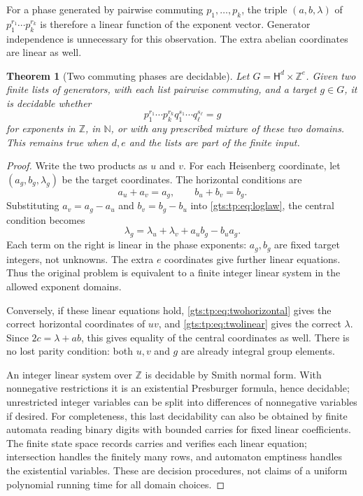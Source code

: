 \documentclass[11pt,letterpaper]{article}
\newtheorem{theorem}{Theorem}[section]
\theoremstyle{definition}
\theoremstyle{remark}
\newcommand{\ZZ}{\mathbb Z}
\newcommand{\NN}{\mathbb N}
\newcommand{\HH}{\mathsf H}
\begin{document}
For a phase generated by pairwise commuting $p_1,\ldots,p_k$, the triple
$(a,b,\lambda)$ of $p_1^{r_1}\cdots p_k^{r_k}$ is therefore a linear function
of the exponent vector. Generator independence is unnecessary for this
observation. The extra abelian coordinates are linear as well.

\begin{theorem}[Two commuting phases are decidable]\label{gts:tp:thm:two}
Let $G=\HH^d\times\ZZ^e$. Given two finite lists of generators, with each list
pairwise commuting, and a target $g\in G$, it is decidable whether
\[
               p_1^{r_1}\cdots p_k^{r_k}
               q_1^{s_1}\cdots q_\ell^{s_\ell}=g
\]
for exponents in $\ZZ$, in $\NN$, or with any prescribed mixture of these
two domains. This remains true when $d,e$ and the lists are part of the
finite input.
\end{theorem}
\begin{proof}
Write the two products as $u$ and $v$. For each Heisenberg coordinate, let
$(a_g,b_g,\lambda_g)$ be the target coordinates. The horizontal conditions
are
\begin{equation}\label{gts:tp:eq:twohorizontal}
                     a_u+a_v=a_g,\qquad b_u+b_v=b_g.
\end{equation}
Substituting $a_v=a_g-a_u$ and $b_v=b_g-b_u$ into
\eqref{gts:tp:eq:loglaw}, the central condition becomes
\begin{equation}\label{gts:tp:eq:twolinear}
             \lambda_g=\lambda_u+\lambda_v+a_u b_g-b_u a_g.
\end{equation}
Each term on the right is linear in the phase exponents: $a_g,b_g$ are
fixed target integers, not unknowns. The extra $e$ coordinates give further
linear equations. Thus the original problem is equivalent to a finite
integer linear system in the allowed exponent domains.

Conversely, if these linear equations hold, \eqref{gts:tp:eq:twohorizontal} gives
the correct horizontal coordinates of $uv$, and \eqref{gts:tp:eq:twolinear} gives
the correct $\lambda$. Since $2c=\lambda+ab$, this gives equality of the
central coordinates as well. There is no lost parity condition: both $u,v$
and $g$ are already integral group elements.

An integer linear system over $\ZZ$ is decidable by Smith normal form.
With nonnegative restrictions it is an existential Presburger formula,
hence decidable; unrestricted integer variables can be split into
differences of nonnegative variables if desired. For completeness, this
last decidability can also be obtained by finite automata reading binary
digits with bounded carries for fixed linear coefficients. The finite
state space records carries and verifies each linear equation; intersection
handles the finitely many rows, and automaton emptiness handles the
existential variables. These are decision procedures, not claims of a
uniform polynomial running time for all domain choices.
\end{proof}
\end{document}
